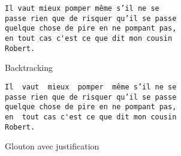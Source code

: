 \documentclass[a4paper, 11pt]{article}
\begin{document}
\begin{figure}
\begin{verbatim}
Il vaut mieux pomper même s’il ne se
passe rien que de risquer qu’il se passe
quelque chose de pire en ne pompant pas,
en tout cas c'est ce que dit mon cousin
Robert.
\end{verbatim}
\caption{Backtracking}
\end{figure}

\begin{figure}
\begin{verbatim}
Il  vaut  mieux  pomper  même s’il ne se
passe rien que de risquer qu’il se passe
quelque chose de pire en ne pompant pas,
en  tout cas c'est ce que dit mon cousin
Robert.
\end{verbatim}
\caption{Glouton avec justification}
\end{figure}

\newpage


\end{document}
